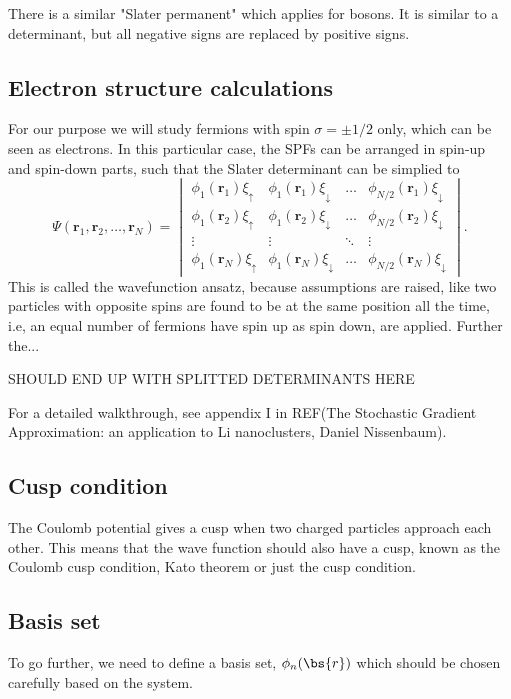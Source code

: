There is a similar "Slater permanent" which applies for bosons. It is similar to a determinant, but all negative signs are replaced by positive signs. 

\subsection{Electron structure calculations} \label{subsubsec:electronsystem}
For our purpose we will study fermions with spin $\sigma=\pm 1/2$ only, which can be seen as electrons. In this particular case, the SPFs can be arranged in spin-up and spin-down parts, such that the Slater determinant can be simplied to 
\begin{equation}
\Psi(\boldsymbol{r}_1,\boldsymbol{r}_2,\hdots,\boldsymbol{r}_N)=
\begin{vmatrix}
\phi_1(\boldsymbol{r}_1)\xi_{\uparrow} & \phi_1(\boldsymbol{r}_1)\xi_{\downarrow} & \hdots & \phi_{N/2}(\boldsymbol{r}_1)\xi_{\downarrow}\\
\phi_1(\boldsymbol{r}_2)\xi_{\uparrow} & \phi_1(\boldsymbol{r}_2)\xi_{\downarrow} & \hdots & \phi_{N/2}(\boldsymbol{r}_2)\xi_{\downarrow}\\
\vdots & \vdots & \ddots & \vdots \\
\phi_1(\boldsymbol{r}_N)\xi_{\uparrow} & \phi_1(\boldsymbol{r}_N)\xi_{\downarrow} & \hdots & \phi_{N/2}(\boldsymbol{r}_N)\xi_{\downarrow}
\end{vmatrix}.
\end{equation}
This is called the wavefunction ansatz, because assumptions are raised, like two particles with opposite spins are found to be at the same position all the time, i.e, an equal number of fermions have spin up as spin down, are applied. Further the...

SHOULD END UP WITH SPLITTED DETERMINANTS HERE

For a detailed walkthrough, see appendix I in REF(The Stochastic Gradient Approximation: an application to Li nanoclusters, Daniel Nissenbaum). 

\subsection{Cusp condition} \label{subsubsec:cusp}
The Coulomb potential gives a cusp when two charged particles approach each other. This means that the wave function should also have a cusp, known as the Coulomb cusp condition, Kato theorem or just the cusp condition. 

\subsection{Basis set} \label{subsubsec:basisset}
To go further, we need to define a basis set, $\phi_n(\bs{r})$ which should be chosen carefully based on the system. 

